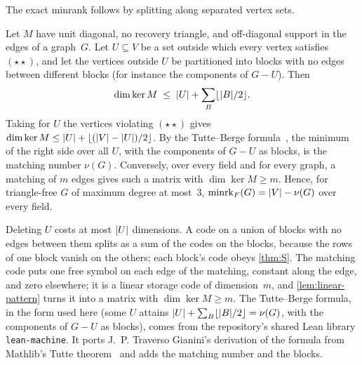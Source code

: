 The exact minrank follows by splitting along separated vertex sets.

\begin{theorem}\label{thm:S-barrier}
Let $M$ have unit diagonal, no recovery triangle, and off-diagonal support in the edges of a graph~$G$. Let $U\subseteq V$ be
a set outside which every vertex satisfies $(\star\star)$, and let the vertices outside $U$ be partitioned into blocks with
no edges between different blocks (for instance the components of $G-U$). Then
\[
  \dim\ker M\;\le\;\lvert U \rvert+\sum_{B}\lfloor\lvert B \rvert/2\rfloor .
\]
Taking for $U$ the vertices violating $(\star\star)$ gives $\dim\ker M\le\lvert U \rvert+\lfloor(\lvert V \rvert-\lvert U \rvert)/2\rfloor$. By the
Tutte--Berge formula~\cite{Berge1958}, the minimum of the right side over all $U$, with the components of $G-U$ as blocks, is the matching
number $\nu(G)$. Conversely, over every field and for every graph, a matching of $m$ edges gives such a matrix with
$\dim\ker M\ge m$. Hence, for triangle-free $G$ of maximum degree at most~$3$, $\mathrm{minrk}_F(G)=\lvert V \rvert-\nu(G)$ over every
field.
\end{theorem}

\begin{outline}
Deleting $U$ costs at most $\lvert U \rvert$ dimensions. A code on a union of blocks with no edges between them splits as a sum
of the codes on the blocks, because the rows of one block vanish on the others; each block's code obeys \cref{thm:S}. The
matching code puts one free symbol on each edge of the matching, constant along the edge, and zero elsewhere; it is a
linear storage code of dimension~$m$, and \cref{lem:linear-pattern} turns it into a matrix with $\dim\ker M\ge m$. The
Tutte--Berge formula, in the form used here (some $U$ attains $\lvert U \rvert+\sum_B\lfloor\lvert B \rvert/2\rfloor=\nu(G)$, with the
components of $G-U$ as blocks), comes from the repository's shared Lean library \texttt{lean-machine}. It ports
J.~P. Traverso Gianini's derivation of the formula from Mathlib's Tutte theorem~\cite{TraversoGianini2026} and adds the
matching number and the blocks.
\end{outline}

